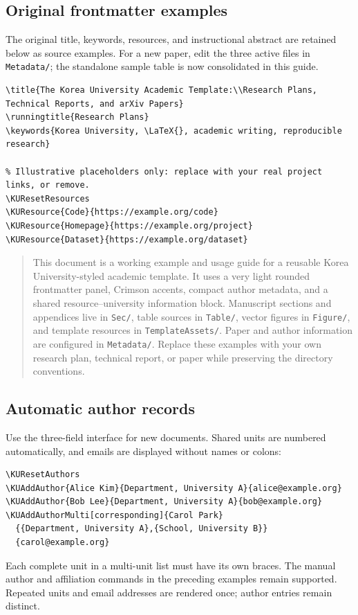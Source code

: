 \subsection{Original frontmatter examples}
The original title, keywords, resources, and instructional abstract are retained below as source examples. For a new paper, edit the three active files in \verb+Metadata/+; the standalone sample table is now consolidated in this guide.
\begin{lstlisting}[style=promptstyle]
% Research Plan, Technical Report, or arXiv Paper: edit these values only.
\title{The Korea University Academic Template:\\Research Plans, Technical Reports, and arXiv Papers}
\runningtitle{Research Plans}
\keywords{Korea University, \LaTeX{}, academic writing, reproducible research}

% Illustrative placeholders only: replace with your real project links, or remove.
\KUResetResources
\KUResource{Code}{https://example.org/code}
\KUResource{Homepage}{https://example.org/project}
\KUResource{Dataset}{https://example.org/dataset}
\end{lstlisting}
\begin{quote}
This document is a working example and usage guide for a reusable Korea University-styled academic template. It uses a very light rounded frontmatter panel, Crimson accents, compact author metadata, and a shared resource--university information block. Manuscript sections and appendices live in \texttt{Sec/}, table sources in \texttt{Table/}, vector figures in \texttt{Figure/}, and template resources in \texttt{TemplateAssets/}. Paper and author information are configured in \texttt{Metadata/}. Replace these examples with your own research plan, technical report, or paper while preserving the directory conventions.
\end{quote}

\subsection{Automatic author records}
Use the three-field interface for new documents. Shared units are numbered automatically, and emails are displayed without names or colons:
\begin{lstlisting}[style=promptstyle]
\KUResetAuthors
\KUAddAuthor{Alice Kim}{Department, University A}{alice@example.org}
\KUAddAuthor{Bob Lee}{Department, University A}{bob@example.org}
\KUAddAuthorMulti[corresponding]{Carol Park}
  {{Department, University A},{School, University B}}
  {carol@example.org}
\end{lstlisting}
Each complete unit in a multi-unit list must have its own braces. The manual author and affiliation commands in the preceding examples remain supported. Repeated units and email addresses are rendered once; author entries remain distinct.
